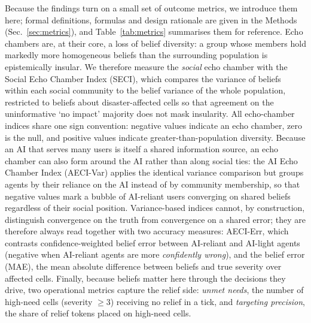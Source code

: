 \documentclass[pdflatex,sn-nature]{sn-jnl}
\begin{document}
Because the findings turn on a small set of outcome metrics, we introduce them here; formal definitions, formulas and design rationale are given in the Methods (Sec.~\ref{sec:metrics}), and Table~\ref{tab:metrics} summarises them for reference. Echo chambers are, at their core, a loss of belief diversity: a group whose members hold markedly more homogeneous beliefs than the surrounding population is epistemically insular. We therefore measure the \emph{social} echo chamber with the Social Echo Chamber Index (SECI), which compares the variance of beliefs within each social community to the belief variance of the whole population, restricted to beliefs about disaster-affected cells so that agreement on the uninformative `no impact' majority does not mask insularity. All echo-chamber indices share one sign convention: negative values indicate an echo chamber, zero is the null, and positive values indicate greater-than-population diversity. Because an AI that serves many users is itself a shared information source, an echo chamber can also form around the AI rather than along social ties: the AI Echo Chamber Index (AECI-Var) applies the identical variance comparison but groups agents by their reliance on the AI instead of by community membership, so that negative values mark a bubble of AI-reliant users converging on shared beliefs regardless of their social position. Variance-based indices cannot, by construction, distinguish convergence on the truth from convergence on a shared error; they are therefore always read together with two accuracy measures: AECI-Err, which contrasts confidence-weighted belief error between AI-reliant and AI-light agents (negative when AI-reliant agents are more \emph{confidently wrong}), and the belief error (MAE), the mean absolute difference between beliefs and true severity over affected cells. Finally, because beliefs matter here through the decisions they drive, two operational metrics capture the relief side: \emph{unmet needs}, the number of high-need cells (severity $\geq 3$) receiving no relief in a tick, and \emph{targeting precision}, the share of relief tokens placed on high-need cells.
\end{document}
